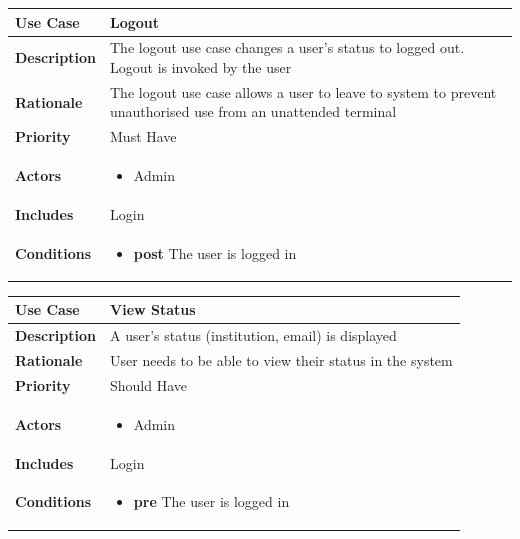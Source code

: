 
\begin{tabular}{|l|p{8.5cm}|}
\hline \textbf{Use Case} & Logout \\
\hline \textbf{Description} & The logout use case changes a user's status to logged out. Logout is invoked by the user \\
\hline \textbf{Rationale} & The logout use case allows a user to leave to system to prevent unauthorised use from an unattended terminal \\
\hline \textbf{Priority} & Must Have \\ 
\hline \textbf{Actors} & 
\begin{itemize}
 \item Admin
\end{itemize} \\
\hline \textbf{Includes} & Login \\
\hline \textbf{Conditions} & 
\begin{itemize}
 \item \textbf{post} The user is logged in
\end{itemize} \\ \hline
\end{tabular}

\vspace{10 mm}


\begin{tabular}{|l|p{8.5cm}|}
\hline \textbf{Use Case} & View Status \\
\hline \textbf{Description} & A user's status (institution, email) is displayed \\
\hline \textbf{Rationale} & User needs to be able to view their status in the system \\
\hline \textbf{Priority} & Should Have \\ 
\hline \textbf{Actors} & 
\begin{itemize}
 \item Admin
\end{itemize} \\
\hline \textbf{Includes} & Login \\
\hline \textbf{Conditions} & 
\begin{itemize}
 \item \textbf{pre} The user is logged in
\end{itemize} \\ \hline
\end{tabular}

